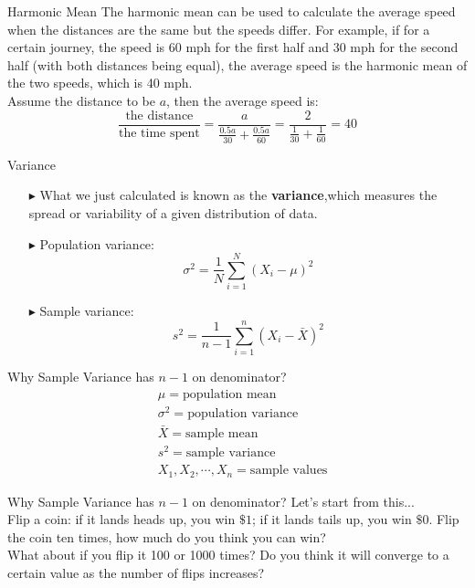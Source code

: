 \documentclass[12pt]{beamer}
\begin{document}
\begin{frame}{Harmonic Mean}
			The harmonic mean can be used to calculate the average speed when the distances are the same but the speeds differ. For example, if for a certain journey, the speed is 60 mph for the first half and 30 mph for the second half (with both distances being equal), the average speed is the harmonic mean of the two speeds, which is 40 mph.\medskip\\
			Assume the distance to be $a$, then the average speed is:
			$$\frac{\text{the distance}}{\text{the time spent}}=\frac{a}{\frac{0.5a}{30}+\frac{0.5a}{60}}=\frac{2}{\frac{1}{30}+\frac{1}{60}}=40$$
	\end{frame}
\begin{frame}{Variance}
	\begin{itemize}
		\item[$\blacktriangleright$]What we just calculated is known as the {\bf variance},which measures the spread or variability of a given distribution of data.
		\item[$\blacktriangleright$]Population variance:$$\sigma^2=\frac{1}{N}\sum_{i=1}^N(X_i-\mu)^2$$
		\item[$\blacktriangleright$]Sample variance:
		$$s^2=\frac{1}{n-1}\sum_{i=1}^n(X_i-\bar{X})^2$$
	\end{itemize}
\end{frame}
\begin{frame}{Why Sample Variance has $n-1$ on denominator?}
	\begin{align*}
		& \mu = \text{population mean} \\
		& \sigma^2 = \text{population variance} \\
		& \bar{X} = \text{sample mean} \\
		& s^2 = \text{sample variance} \\
		& X_1, X_2, \cdots, X_n = \text{sample values}
	\end{align*}
\end{frame}
\begin{frame}{Why Sample Variance has $n-1$ on denominator?}
Let's start from this...\medskip\\
Flip a coin: if it lands heads up, you win $\$1$; if it lands tails up, you win $\$0$. Flip the coin ten times, how much do you think you can win?\medskip\\
What about if you flip it 100 or 1000 times? Do you think it will converge to a certain value as the number of flips increases?
\end{frame}
\end{document}
